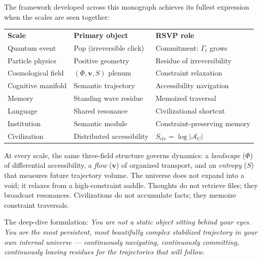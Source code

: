 \begin{tcolorbox}[enhanced, breakable,
  colback=RSVPdeep!8, colframe=RSVPdeep, arc=6pt, boxrule=0.8pt,
  title={\bfseries\sffamily The Unified Picture: From Quantum Event to Civilization},
  coltitle=white, attach boxed title to top left={yshift=-2mm,xshift=6mm},
  boxed title style={colback=RSVPdeep,sharp corners},
  top=5mm,left=5mm,right=5mm,bottom=5mm]

  The framework developed across this monograph achieves its fullest
  expression when the scales are seen together:

  \medskip
  \begin{tabular}{@{}lll@{}}
    \textbf{Scale} & \textbf{Primary object} & \textbf{RSVP role} \\[3pt]
    Quantum event & Pop (irreversible click) & Commitment: $\Gamma_t$ grows \\
    Particle physics & Positive geometry & Residue of irreversibility \\
    Cosmological field & $(\Phi, \mathbf{v}, S)$ plenum & Constraint relaxation \\
    Cognitive manifold & Semantic trajectory & Accessibility navigation \\
    Memory & Standing wave residue & Memoized traversal \\
    Language & Shared resonance & Civilizational shortcut \\
    Institution & Semantic module & Constraint-preserving memory \\
    Civilization & Distributed accessibility & $S_\text{civ} = \log |\mathcal{A}_C|$ \\
  \end{tabular}

  \medskip
  At every scale, the same three-field structure governs dynamics:
  a \emph{landscape} ($\Phi$) of differential accessibility,
  a \emph{flow} ($\mathbf{v}$) of organized transport,
  and an \emph{entropy} ($S$) that measures future trajectory volume.
  The universe does not expand into a void; it relaxes from a high-constraint
  saddle. Thoughts do not retrieve files; they broadcast resonances.
  Civilizations do not accumulate facts; they memoize constraint traversals.

  The deep-dive formulation: \emph{You are not a static object sitting
  behind your eyes. You are the most persistent, most beautifully
  complex stabilized trajectory in your own internal universe —
  continuously navigating, continuously committing, continuously
  leaving residues for the trajectories that will follow.}
\end{tcolorbox}


